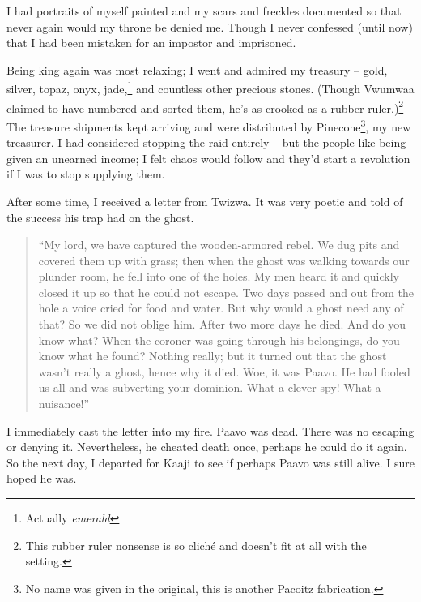 I had portraits of myself painted and my scars and freckles documented so that never again would my throne be denied me. Though I never confessed (until now) that I had been mistaken for an impostor and imprisoned.

Being king again was most relaxing; I went and admired my treasury -- gold, silver, topaz, onyx, jade,\footnote{Actually \emph{emerald}} and countless other precious stones. (Though Vwumwaa claimed to have numbered and sorted them, he's as crooked as a rubber ruler.)\footnote{This rubber ruler nonsense is so clich\'{e} and doesn't fit at all with the setting.} The treasure shipments kept arriving and were distributed by Pinecone\footnote{No name was given in the original, this is another Pacoitz fabrication.}, my new treasurer. I had considered stopping the raid entirely -- but the people like being given an unearned income; I felt chaos would follow and they'd start a revolution if I was to stop supplying them.

After some time, I received a letter from Twizwa. It was very poetic and told of the success his trap had on the ghost.

\begin{quote}``My lord, we have captured the wooden-armored rebel. We dug pits and covered them up with grass; then when the ghost was walking towards our plunder room, he fell into one of the holes. My men heard it and quickly closed it up so that he could not escape. Two days passed and out from the hole a voice cried for food and water. But why would a ghost need any of that? So we did not oblige him. After two more days he died. And do you know what? When the coroner was going through his belongings, do you know what he found? Nothing really; but it turned out that the ghost wasn't really a ghost, hence why it died. Woe, it was Paavo. He had fooled us all and was subverting your dominion. What a clever spy! What a nuisance!''
\end{quote}

I immediately cast the letter into my fire. Paavo was dead. There was no escaping or denying it. Nevertheless, he cheated death once, perhaps he could do it again. So the next day, I departed for Kaaji to see if perhaps Paavo was still alive. I sure hoped he was.
